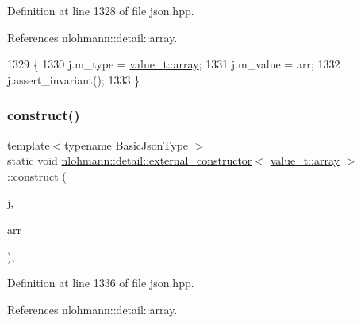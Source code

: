 Definition at line 1328 of file json.\+hpp.



References nlohmann\+::detail\+::array.


\begin{DoxyCode}
1329     \{
1330         j.m\_type = \hyperlink{namespacenlohmann_1_1detail_a1ed8fc6239da25abcaf681d30ace4985af1f713c9e000f5d3f280adbd124df4f5}{value\_t::array};
1331         j.m\_value = arr;
1332         j.assert\_invariant();
1333     \}
\end{DoxyCode}
\mbox{\label{structnlohmann_1_1detail_1_1external__constructor_3_01value__t_1_1array_01_4_a50474d6624957a630a1d398cac1e7bfa}} 
\subsubsection{\texorpdfstring{construct()}{construct()}\hspace{0.1cm}{\footnotesize\ttfamily [2/5]}}
{\footnotesize\ttfamily template$<$typename Basic\+Json\+Type $>$ \\
static void \hyperlink{structnlohmann_1_1detail_1_1external__constructor}{nlohmann\+::detail\+::external\+\_\+constructor}$<$ \hyperlink{namespacenlohmann_1_1detail_a1ed8fc6239da25abcaf681d30ace4985af1f713c9e000f5d3f280adbd124df4f5}{value\+\_\+t\+::array} $>$\+::construct (\begin{DoxyParamCaption}\item[{Basic\+Json\+Type \&}]{j,  }\item[{typename Basic\+Json\+Type\+::array\+\_\+t \&\&}]{arr }\end{DoxyParamCaption})\hspace{0.3cm}{\ttfamily [inline]}, {\ttfamily [static]}}



Definition at line 1336 of file json.\+hpp.



References nlohmann\+::detail\+::array.


